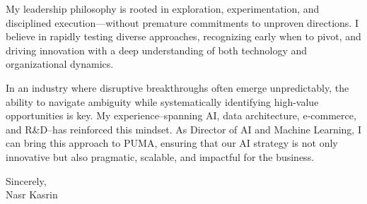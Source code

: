 
\vspace{2ex}


My leadership philosophy is rooted in exploration, experimentation, and disciplined execution—without premature commitments to unproven directions. I believe in rapidly testing diverse approaches, recognizing early when to pivot, and driving innovation with a deep understanding of both technology and organizational dynamics.


\vspace{1ex}


In an industry where disruptive breakthroughs often emerge unpredictably, the ability to navigate ambiguity while systematically identifying high-value opportunities is key. My experience--spanning AI, data architecture, e-commerce, and R\&D--has reinforced this mindset. As Director of AI and Machine Learning, I can bring this approach to PUMA, ensuring that our AI strategy is not only innovative but also pragmatic, scalable, and impactful for the business.







\vspace{5ex}

Sincerely,\\
	
Nasr Kasrin


